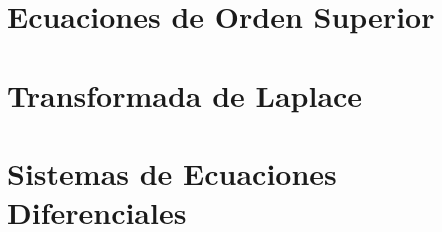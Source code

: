 \documentclass[
]{amsbook}
\begin{document}
\chapter{Ecuaciones de Orden Superior}








\chapter{Transformada de Laplace}






\chapter{Sistemas de Ecuaciones Diferenciales}




%
{}

\end{document}
